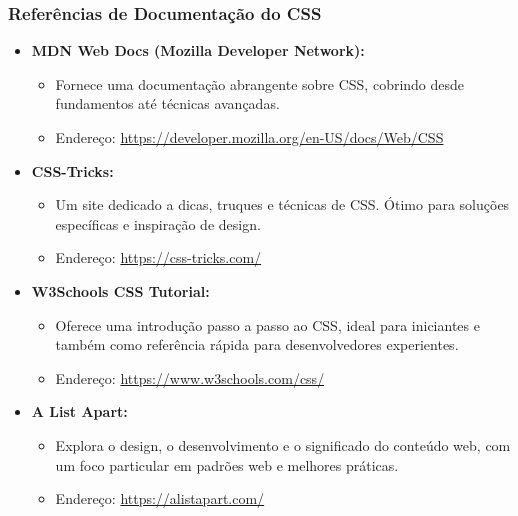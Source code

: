 \begin{frame}[fragile]
  \frametitle{Referências de Documentação do CSS}
  \begin{itemize}
    \item \textbf{MDN Web Docs (Mozilla Developer Network):}
      \begin{itemize}
        \item Fornece uma documentação abrangente sobre CSS, cobrindo desde fundamentos até técnicas avançadas.
        \item Endereço: \url{https://developer.mozilla.org/en-US/docs/Web/CSS}
      \end{itemize}
    \item \textbf{CSS-Tricks:}
      \begin{itemize}
        \item Um site dedicado a dicas, truques e técnicas de CSS. Ótimo para soluções específicas e inspiração de design.
        \item Endereço: \url{https://css-tricks.com/}
      \end{itemize}
    \item \textbf{W3Schools CSS Tutorial:}
      \begin{itemize}
        \item Oferece uma introdução passo a passo ao CSS, ideal para iniciantes e também como referência rápida para desenvolvedores experientes.
        \item Endereço: \url{https://www.w3schools.com/css/}
      \end{itemize}
    \item \textbf{A List Apart:}
      \begin{itemize}
        \item Explora o design, o desenvolvimento e o significado do conteúdo web, com um foco particular em padrões web e melhores práticas.
        \item Endereço: \url{https://alistapart.com/}
      \end{itemize}
  \end{itemize}
\end{frame}
